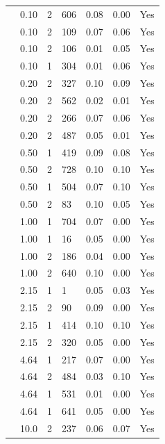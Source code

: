 \begin{longtable}{ | M{2.0cm} | M{2.0cm} | M{1.5cm} | M{1.5cm} | M{2.0cm} | M{2.0cm} | M{1.5cm} | }
                 & 0.10 & 2 & 606 & 0.08 & 0.00 & Yes \\
                 & 0.10 & 2 & 109 & 0.07 & 0.06 & Yes \\
                 & 0.10 & 2 & 106 & 0.01 & 0.05 & Yes \\
                 & 0.10 & 1 & 304 & 0.01 & 0.06 & Yes \\
                 & 0.20 & 2 & 327 & 0.10 & 0.09 & Yes \\
                 & 0.20 & 2 & 562 & 0.02 & 0.01 & Yes \\
                 & 0.20 & 2 & 266 & 0.07 & 0.06 & Yes \\
                 & 0.20 & 2 & 487 & 0.05 & 0.01 & Yes \\
                 & 0.50 & 1 & 419 & 0.09 & 0.08 & Yes \\
                 & 0.50 & 2 & 728 & 0.10 & 0.10 & Yes \\
                 & 0.50 & 1 & 504 & 0.07 & 0.10 & Yes \\
                 & 0.50 & 2 & 83  & 0.10 & 0.05 & Yes \\
                 & 1.00 & 1 & 704 & 0.07 & 0.00 & Yes \\
                 & 1.00 & 1 & 16  & 0.05 & 0.00 & Yes \\
                 & 1.00 & 2 & 186 & 0.04 & 0.00 & Yes \\
                 & 1.00 & 2 & 640 & 0.10 & 0.00 & Yes \\
                 & 2.15 & 1 & 1   & 0.05 & 0.03 & Yes \\
                 & 2.15 & 2 & 90  & 0.09 & 0.00 & Yes \\
                 & 2.15 & 1 & 414 & 0.10 & 0.10 & Yes \\
                 & 2.15 & 2 & 320 & 0.05 & 0.00 & Yes \\
                 & 4.64 & 1 & 217 & 0.07 & 0.00 & Yes \\
                 & 4.64 & 2 & 484 & 0.03 & 0.10 & Yes \\
                 & 4.64 & 1 & 531 & 0.01 & 0.00 & Yes \\
                 & 4.64 & 1 & 641 & 0.05 & 0.00 & Yes \\
                 & 10.0 & 2 & 237 & 0.06 & 0.07 & Yes \\

\end{longtable}
